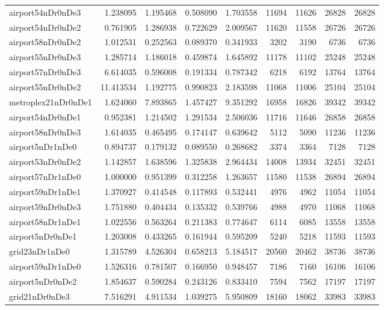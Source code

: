 \begin{longtable}{|l|r|r|r|r|r|r|r|r|}
airport54nDr0nDe3 & 1.238095 & 1.195468 & 0.508090 & 1.703558 & 11694 & 11626 & 26828 & 26828 \\
airport54nDr0nDe2 & 0.761905 & 1.286938 & 0.722629 & 2.009567 & 11620 & 11558 & 26726 & 26726 \\
airport58nDr0nDe2 & 1.012531 & 0.252563 & 0.089370 & 0.341933 & 3202 & 3190 & 6736 & 6736 \\
airport55nDr0nDe3 & 1.285714 & 1.186018 & 0.459874 & 1.645892 & 11178 & 11102 & 25248 & 25248 \\
airport57nDr0nDe3 & 6.614035 & 0.596008 & 0.191334 & 0.787342 & 6218 & 6192 & 13764 & 13764 \\
airport55nDr0nDe2 & 11.413534 & 1.192775 & 0.990823 & 2.183598 & 11068 & 11006 & 25104 & 25104 \\
metroplex21nDr0nDe1 & 1.624060 & 7.893865 & 1.457427 & 9.351292 & 16958 & 16826 & 39342 & 39342 \\
airport54nDr0nDe1 & 0.952381 & 1.214502 & 1.291534 & 2.506036 & 11716 & 11646 & 26858 & 26858 \\
airport58nDr0nDe3 & 1.614035 & 0.465495 & 0.174147 & 0.639642 & 5112 & 5090 & 11236 & 11236 \\
airport5nDr1nDe0 & 0.894737 & 0.179132 & 0.089550 & 0.268682 & 3374 & 3364 & 7128 & 7128 \\
airport53nDr0nDe2 & 1.142857 & 1.638596 & 1.325838 & 2.964434 & 14008 & 13934 & 32451 & 32451 \\
airport57nDr1nDe0 & 1.000000 & 0.951399 & 0.312258 & 1.263657 & 11580 & 11538 & 26894 & 26894 \\
airport59nDr1nDe1 & 1.370927 & 0.414548 & 0.117893 & 0.532441 & 4976 & 4962 & 11054 & 11054 \\
airport59nDr0nDe3 & 1.751880 & 0.404434 & 0.135332 & 0.539766 & 4988 & 4970 & 11068 & 11068 \\
airport58nDr1nDe1 & 1.022556 & 0.563264 & 0.211383 & 0.774647 & 6114 & 6085 & 13558 & 13558 \\
airport5nDr0nDe1 & 1.203008 & 0.433265 & 0.161944 & 0.595209 & 5240 & 5218 & 11593 & 11593 \\
grid23nDr1nDe0 & 1.315789 & 4.526304 & 0.658213 & 5.184517 & 20560 & 20462 & 38736 & 38736 \\
airport59nDr1nDe0 & 1.526316 & 0.781507 & 0.166950 & 0.948457 & 7186 & 7160 & 16106 & 16106 \\
airport5nDr0nDe2 & 1.854637 & 0.590284 & 0.243126 & 0.833410 & 7594 & 7562 & 17197 & 17197 \\
grid21nDr0nDe3 & 7.516291 & 4.911534 & 1.039275 & 5.950809 & 18160 & 18062 & 33983 & 33983 \\

\end{longtable}
